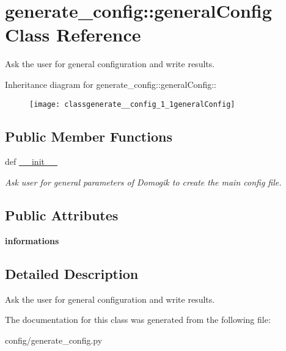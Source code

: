 \hypertarget{classgenerate__config_1_1generalConfig}{
\section{generate\_\-config::generalConfig Class Reference}
\label{classgenerate__config_1_1generalConfig}
}
Ask the user for general configuration and write results.  


Inheritance diagram for generate\_\-config::generalConfig::\begin{figure}[H]
\begin{center}
\leavevmode
\texttt{[image: classgenerate\_\_config\_1\_1generalConfig]}
\end{center}
\end{figure}
\subsection*{Public Member Functions}
\begin{CompactItemize}
\item 
\hypertarget{classgenerate__config_1_1generalConfig_470de1124f102c64ad61af244dbac061}{
def \hyperlink{classgenerate__config_1_1generalConfig_470de1124f102c64ad61af244dbac061}{\_\-\_\-init\_\-\_\-}}
\label{classgenerate__config_1_1generalConfig_470de1124f102c64ad61af244dbac061}

\begin{CompactList}\small\item\em Ask user for general parameters of Domogik to create the main config file. \item\end{CompactList}\end{CompactItemize}
\subsection*{Public Attributes}
\begin{CompactItemize}
\item 
\hypertarget{classgenerate__config_1_1generalConfig_09618ac3f372ea4e8004e2739428995d}{
\textbf{informations}}
\label{classgenerate__config_1_1generalConfig_09618ac3f372ea4e8004e2739428995d}

\end{CompactItemize}


\subsection{Detailed Description}
Ask the user for general configuration and write results. 

The documentation for this class was generated from the following file:\begin{CompactItemize}
\item 
config/generate\_\-config.py\end{CompactItemize}
